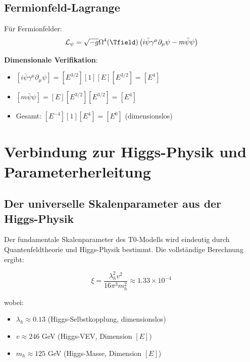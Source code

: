 	\subsection{Fermionfeld-Lagrange}
	\label{subsec:fermionfeld_lagrange}
	
	Für Fermionfelder:
	\begin{equation}
		\mathcal{L}_\psi = \sqrt{-g} \Omega^4(\Tfield) \left(i\bar{\psi}\gamma^\mu\partial_\mu\psi - m\bar{\psi}\psi\right)
		\label{eq:fermion_lagrange}
	\end{equation}
	
	\textbf{Dimensionale Verifikation}:
	\begin{itemize}
		\item $[i\bar{\psi}\gamma^\mu\partial_\mu\psi] = [E^{3/2}][1][E][E^{3/2}] = [E^4]$
		\item $[m\bar{\psi}\psi] = [E][E^{3/2}][E^{3/2}] = [E^4]$
		\item Gesamt: $[E^{-4}][1][E^4] = [E^0]$ (dimensionslos) \checkmark
	\end{itemize}
	
	\section{Verbindung zur Higgs-Physik und Parameterherleitung}
	\label{sec:higgs_parameter_verbindung}
	
	\subsection{Der universelle Skalenparameter aus der Higgs-Physik}
	\label{subsec:universeller_skalenparameter}
	
	Der fundamentale Skalenparameter des T0-Modells wird eindeutig durch Quantenfeldtheorie und Higgs-Physik bestimmt. Die vollständige Berechnung ergibt:
	
	\begin{equation}
		\boxed{\xi = \frac{\lambda_h^2 v^2}{16\pi^3 m_h^2} \approx 1.33 \times 10^{-4}}
		\label{eq:xi_higgs_universal}
	\end{equation}
	
	wobei:
	\begin{itemize}
		\item $\lambda_h \approx 0.13$ (Higgs-Selbstkopplung, dimensionslos)
		\item $v \approx 246$ GeV (Higgs-VEV, Dimension $[E]$)
		\item $m_h \approx 125$ GeV (Higgs-Masse, Dimension $[E]$)
	\end{itemize}
	
